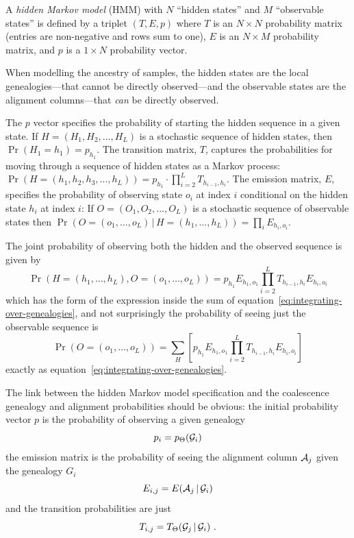 A \emph{hidden Markov model} (HMM) with $N$ ``hidden states'' and $M$ ``observable states'' is defined by a triplet $(T,E,p)$ where $T$ is an $N\times N$ probability matrix (entries are non-negative and rows sum to one), $E$ is an $N\times M$ probability matrix, and $p$ is a $1\times N$ probability vector.

When modelling the ancestry of samples, the hidden states are the local genealogies---that cannot be directly observed---and the observable states are the alignment columns---that \emph{can} be directly observed.

The $p$ vector specifies the probability of starting the hidden sequence in a given state. If $H=(H_1,H_2,\ldots,H_L)$ is a stochastic sequence of hidden states, then $\Pr(H_1=h_1)=p_{h_1}$. The transition matrix, $T$, captures the probabilities for moving through a sequence of hidden states as a Markov process:
\(
    \Pr(H=(h_1,h_2,h_3,\ldots,h_L)) =
    p_{h_1} \cdot \prod_{i=2}^L T_{h_{i-1},h_i}
\). The emission matrix, $E$, specifies the probability of observing state $o_i$ at index $i$ conditional on the hidden state $h_i$ at index $i$: If $O=(O_1,O_2,\ldots,O_L)$ is a stochastic sequence of observable states then 
\(
    \Pr(O=(o_1,\ldots,o_L)\,|\,H=(h_1,\ldots,h_L)) = \prod_i E_{h_i,o_i}
    .
\)

The joint probability of observing both the hidden and the observed sequence is given by
\begin{dmath*}
  \Pr\left(H=(h_1,\ldots,h_L), O=(o_1,\ldots,o_L)\right) =
  p_{h_1} E_{h_1,o_1} \prod_{i=2}^L T_{h_{i-1},h_i} E_{h_i,o_i}
\end{dmath*}
which has the form of the expression inside the sum of equation~\eqref{eq:integrating-over-genealogies}, and not surprisingly the probability of seeing just the observable sequence is
\begin{dmath*}
  \Pr\left(O=(o_1,\ldots,o_L)\right) =
  \sum_{H} \left[
      p_{h_1} E_{h_1,o_1} \prod_{i=2}^L T_{h_{i-1},h_i} E_{h_i,o_i}
  \right]
\end{dmath*}
exactly as equation~\eqref{eq:integrating-over-genealogies}.

The link between the hidden Markov model specification and the coalescence genealogy and alignment probabilities should be obvious: the initial probability vector $p$ is the probability of observing a given genealogy
\begin{dmath*}
    p_i = p_\Theta(\G_i)
\end{dmath*}
the emission matrix is the probability of seeing the alignment column $\mathcal{A}_j$ given the genealogy $G_i$
\begin{dmath*}
    E_{i,j} = E(\A_j\,|\,\G_i)
\end{dmath*}
and the transition probabilities are just
\begin{dmath*}
    T_{i,j} = T_\Theta(\G_j\,|\,\G_i)
    \ .
\end{dmath*}

